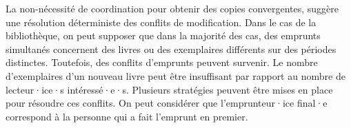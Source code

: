 %
%
%
%

La non-nécessité de coordination pour obtenir des copies convergentes, suggère une résolution déterministe des conflits de modification.
Dans le cas de la bibliothèque, on peut supposer que dans la majorité des cas, des emprunts simultanés concernent des livres ou des exemplaires différents sur des périodes distinctes.
Toutefois, des conflits d'emprunts peuvent survenir.
Le nombre d'exemplaires d'un nouveau livre peut être insuffisant par rapport au nombre de lecteur·ice·s intéressé·e·s.
Plusieurs stratégies peuvent être mises en place pour résoudre ces conflits.
On peut considérer que l'emprunteur·ice final·e correspond à la personne qui a fait l'emprunt en premier.

